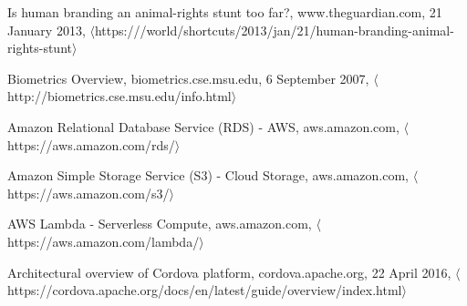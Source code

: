\begin{thebibliography}{1}

  Is human branding an animal-rights stunt too far?,
  www.theguardian.com,
  21 January 2013,
  $\langle$https:///world/shortcuts/2013/jan/21/human-branding-animal-rights-stunt$\rangle$

  Biometrics Overview,
  biometrics.cse.msu.edu,
  6 September 2007,
  $\langle$http://biometrics.cse.msu.edu/info.html$\rangle$

  Amazon Relational Database Service (RDS) - AWS,
  aws.amazon.com,
  $\langle$https://aws.amazon.com/rds/$\rangle$

  Amazon Simple Storage Service (S3) - Cloud Storage,
  aws.amazon.com,
  $\langle$https://aws.amazon.com/s3/$\rangle$

  AWS Lambda - Serverless Compute,
  aws.amazon.com,
  $\langle$https://aws.amazon.com/lambda/$\rangle$
  
  Architectural overview of Cordova platform,
  cordova.apache.org,
  22 April 2016,
  $\langle$https://cordova.apache.org/docs/en/latest/guide/overview/index.html$\rangle$

\end{thebibliography}
